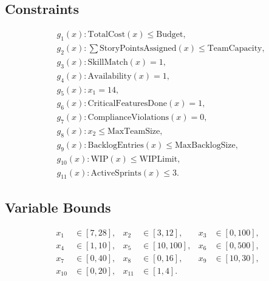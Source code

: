 \documentclass{article}
\begin{document}
\subsection*{Constraints}
\[
\begin{aligned}
& g_1(x): \text{TotalCost}(x) \le \text{Budget}, \\
& g_2(x): \sum \text{StoryPointsAssigned}(x) \le \text{TeamCapacity}, \\
& g_3(x): \text{SkillMatch}(x) = 1, \\
& g_4(x): \text{Availability}(x) = 1, \\
& g_5(x): x_1 = 14, \\
& g_6(x): \text{CriticalFeaturesDone}(x) = 1, \\
& g_7(x): \text{ComplianceViolations}(x) = 0, \\
& g_8(x): x_2 \le \text{MaxTeamSize}, \\
& g_9(x): \text{BacklogEntries}(x) \le \text{MaxBacklogSize}, \\
& g_{10}(x): \text{WIP}(x) \le \text{WIPLimit}, \\
& g_{11}(x): \text{ActiveSprints}(x) \le 3.
\end{aligned}
\]

\subsection*{Variable Bounds}
\[
\begin{aligned}
x_1 &\in [7, 28], &
x_2 &\in [3, 12], &
x_3 &\in [0, 100], \\
x_4 &\in [1, 10], &
x_5 &\in [10, 100], &
x_6 &\in [0, 500], \\
x_7 &\in [0, 40], &
x_8 &\in [0, 16], &
x_9 &\in [10, 30], \\
x_{10} &\in [0, 20], &
x_{11} &\in [1, 4].
\end{aligned}
\]
\end{document}
